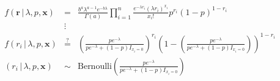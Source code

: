 \documentclass[11pt]{article}
\begin{document}
\subsubsection{}

\begin{eqnarray*}
  f\left(\mathbf{r}\,|\,\lambda,p,\mathbf{x}\right)&=&\frac{b^a\lambda^{a-1}e^{-b\lambda}}{\Gamma\left(a\right)}\prod_{i=1}^n\frac{e^{-\lambda r_i}\left(\lambda r_i\right)^{x_i}}{x_i!}p^{r_i}\left(1-p\right)^{1-r_i}\\
                                                   &\vdots&\\
  f\left(r_i\,|\,\lambda,p,\mathbf{x}\right)&\stackrel{?}{=}&\left(\frac{pe^{-\lambda}}{pe^{-\lambda}+\left(1-p\right)I_{x_i=0}}\right)^{r_i}\left(1-\left(\frac{pe^{-\lambda}}{pe^{-\lambda}+\left(1-p\right)I_{x_i=0}}\right)\right)^{1-r_i}\\
  \left(r_i\,|\,\lambda,p,\mathbf{x}\right)&\sim&\textrm{Bernoulli}\left(\frac{pe^{-\lambda}}{pe^{-\lambda}+\left(1-p\right)I_{x_i=0}}\right)
\end{eqnarray*}

\subsection{}

\section{}
\end{document}
